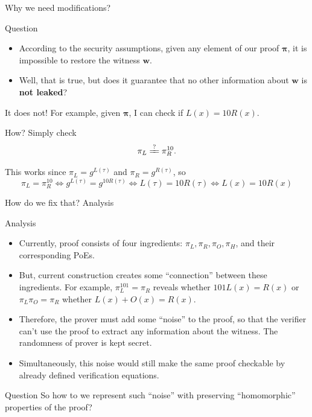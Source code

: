 \documentclass{zkdl-presentation-template}
\begin{document}
    \begin{frame}{Why we need modifications?}
        \begin{alertblock}{Question}
            \begin{itemize}[label=]
                \item According to the security assumptions, given any element of our proof $\boldsymbol{\pi}$, it is impossible to restore the witness $\boldsymbol{w}$.\pause
                \item Well, that is true, but does it guarantee that no other information about $\boldsymbol{w}$ is \textbf{not leaked}?\pause
            \end{itemize}

            It does not! For example, given $\boldsymbol{\pi}$, I can check if $L(x) = 10R(x)$. \pause
            
            How? Simply check
            \begin{equation*}
                \pi_L \xlongequal{?} \pi_R^{10}.
            \end{equation*}

            \pause This works since $\pi_L = g^{L(\tau)}$ and $\pi_R = g^{R(\tau)}$, so
            \begin{equation*}
                \pi_L = \pi_R^{10} \Leftrightarrow g^{L(\tau)} = g^{10R(\tau)} \Leftrightarrow L(\tau) = 10R(\tau) \Leftrightarrow L(x) = 10R(x)
            \end{equation*}
        \end{alertblock}
    \end{frame}

    \begin{frame}{How do we fix that? Analysis}
        \begin{block}{Analysis}
            \begin{itemize}[label=]
                \item Currently, proof consists of four ingredients: $\pi_L, \pi_R, \pi_O, \pi_H$, and their corresponding PoEs. \pause
                \item But, current construction creates some ``connection'' between these ingredients. For example, $\pi_L^{101} = \pi_R$ reveals whether $101L(x)=R(x)$ or $\pi_L\pi_O=\pi_R$ whether $L(x) + O(x) = R(x)$. \pause
                \item Therefore, the prover must add some ``noise'' to the proof, so that the verifier can't use the proof to extract any information about the witness. The randomness of prover is kept secret. \pause
                \item Simultaneously, this noise would still make the same proof checkable by already defined verification equations.
            \end{itemize}
        \end{block}

        \begin{alertblock}{Question}
            So how to we represent such ``noise'' with preserving ``homomorphic'' properties of the proof?
        \end{alertblock}
    \end{frame}
\end{document}
